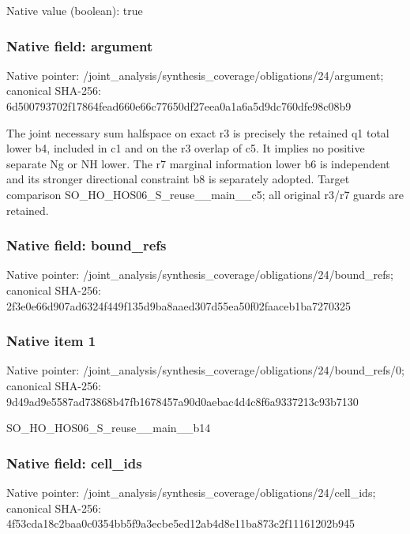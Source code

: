 \documentclass[10pt,a4paper]{article}
\begin{document}
Native value (boolean): true

\subsubsection{Native field: argument}
Native pointer: /joint\_\allowbreak{}analysis/synthesis\_\allowbreak{}coverage/obligations/24/argument; canonical SHA-256: 6d500793702f17864fead660e66c77650df27eea0a1a6a5d9dc760dfe98c08b9

\begingroup\raggedright\sloppy The joint necessary sum halfspace on exact r3 is precisely the retained q1 total lower b4,\allowbreak{} included in c1 and on the r3 overlap of c5. It implies no positive separate Ng or NH lower. The r7 marginal information lower b6 is independent and its stronger directional constraint b8 is separately adopted. Target comparison SO\_\allowbreak{}HO\_\allowbreak{}HOS06\_\allowbreak{}S\_\allowbreak{}reuse\_\allowbreak{}\_\allowbreak{}main\_\allowbreak{}\_\allowbreak{}c5;\allowbreak{} all original r3/\allowbreak{}r7 guards are retained.\par\endgroup

\subsubsection{Native field: bound\_\allowbreak{}refs}
Native pointer: /joint\_\allowbreak{}analysis/synthesis\_\allowbreak{}coverage/obligations/24/bound\_\allowbreak{}refs; canonical SHA-256: 2f3e0e66d907ad6324f449f135d9ba8aaed307d55ea50f02faaceb1ba7270325

\subsubsection{Native item 1}
Native pointer: /joint\_\allowbreak{}analysis/synthesis\_\allowbreak{}coverage/obligations/24/bound\_\allowbreak{}refs/0; canonical SHA-256: 9d49ad9e5587ad73868b47fb1678457a90d0aebac4d4c8f6a9337213c93b7130

\begingroup\raggedright\sloppy SO\_\allowbreak{}HO\_\allowbreak{}HOS06\_\allowbreak{}S\_\allowbreak{}reuse\_\allowbreak{}\_\allowbreak{}main\_\allowbreak{}\_\allowbreak{}b14\par\endgroup

\subsubsection{Native field: cell\_\allowbreak{}ids}
Native pointer: /joint\_\allowbreak{}analysis/synthesis\_\allowbreak{}coverage/obligations/24/cell\_\allowbreak{}ids; canonical SHA-256: 4f53cda18c2baa0c0354bb5f9a3ecbe5ed12ab4d8e11ba873c2f11161202b945
\end{document}
